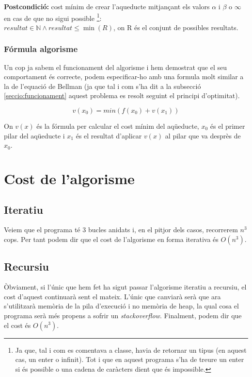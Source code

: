 \documentclass[12pt, letterpaper]{article}
\begin{document}
\textbf{Postcondició:} cost mínim de crear l'aqueducte mitjançant els valors $\alpha$ i $\beta$ o $\infty$ en cas de que no sigui possible \footnote{Ja que, tal i com es comentava a classe, havia de retornar un tipus (en aquest cas, un enter o infinit). Tot i que en aquest programa s'ha de treure un enter si és possible o una cadena de caràcters dient que és impossible.}:\\

        $ resultat \in \mathbb{N} \land resultat \leq \min(R) $, on R és el conjunt de possibles resultats.


 
\subsubsection{Fórmula algorisme}
Un cop ja sabem el funcionament del algorisme i hem demostrat que el seu comportament és correcte, podem especificar-ho amb una formula molt similar a la de l'equació de Bellman (ja que tal i com s'ha dit a la subsecció \ref{seccio:funcionament} aquest problema es resolt seguint el principi d'optimitat).
\begin{center}
\begin{equation}
v(x_{0}) = min(f(x_{0}) + v(x_{1}))
\end{equation}
\end{center}

On $v(x)$ és la fórmula per calcular el cost mínim del aqüeducte, $x_{0}$ és el primer pilar del aqüeducte i $x_{1}$ és el resultat d'aplicar $v(x)$ al pilar que va desprès de $x_{0}$.

\section{Cost de l'algorisme}
\subsection{Iteratiu}
Veiem que el programa té 3 bucles anidats i, en el pitjor dels casos, recorrerem $n^3$ cops.
Per tant podem dir que el cost de l'algorisme en forma iterativa és $O(n^{3})$.

\subsection{Recursiu}
Òbviament, si l'únic que hem fet ha sigut passar l'algorisme iteratiu a recursiu, el cost d'aquest continuarà sent el mateix. L'únic que canviarà serà que ara s'utilitzarà memòria de la pila d'execució i no 
memòria de heap, la qual cosa el programa serà més propens a sofrir un \textit{stackoverflow}. Finalment, podem dir que el cost és $O(n^{3})$.
\end{document}
